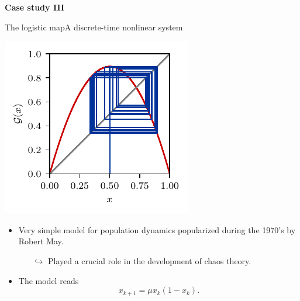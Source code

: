 \documentclass[usenames,dvipsnames,svgnames,10pt,aspectratio=169]{beamer}
\begin{document}
\begin{frame}[t, c]{}{}
	\centering

	{\Large \textbf{Case study III}}

	\bigskip


	\vspace{-2cm}
\end{frame}

\begin{frame}[t, c]{The logistic map}{A discrete-time nonlinear system}
	\begin{minipage}{.28\textwidth}
		\includegraphics[width=\textwidth]{logistic_map_cobweb_plot_8}
	\end{minipage}%
	\hfill
	\begin{minipage}{.68\textwidth}
		\begin{itemize}
			\item Very simple model for population dynamics popularized during the 1970's by Robert May.
			\begin{itemize}
				\item[\( \hookrightarrow \)] Played a crucial role in the development of chaos theory.
			\end{itemize}

			\medskip

			\item The model reads
			\[
				x_{k+1} = \mu x_k ( 1 - x_k ).
			\]


\end{itemize}
\end{minipage}
\end{frame}
\end{document}
